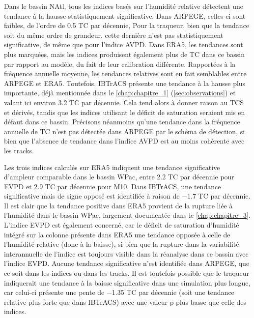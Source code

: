 \documentclass[../main.tex]{subfiles}
\begin{document}
Dans le bassin NAtl, tous les indices basés sur l'humidité relative détectent une tendance à la hausse statistiquement significative. Dans ARPEGE, celles-ci
sont faibles, de l'ordre de \num{0.5} TC par décennie, Pour la traqueur, bien que la tendance soit du même ordre de grandeur, cette dernière n'est pas
statistiquement significative, de même que pour l'indice AVPD. Dans ERA5, les tendances sont plus marquées, mais les indices produisent également plus de TC
dans ce bassin par rapport au modèle, du fait de leur calibration différente. Rapportées à la fréquence annuelle moyenne, les tendances relatives sont en fait
semblables entre ARPEGE et ERA5. Toutefois, IBTrACS présente une tendance à la hausse plus importante, déjà mentionnée dans le \cref{chap:chapitre_1}
(\cref{sec:observations}) et valant ici environ \num{3.2} TC par décennie. Cela tend alors à donner raison au TCS et dérivés, tandis que les indices utilisant
le déficit de saturation seraient mis en défaut dans ce bassin. Précisons néanmoins qu'une tendance dans la fréquence annuelle de TC n'est pas détectée dans
ARPEGE par le schéma de détection, si bien que l'absence de tendance dans l'indice AVPD est au moins cohérente avec les tracks.

Les trois indices calculés sur ERA5 indiquent une tendance significative d'ampleur comparable dans le bassin WPac, entre \num{2.2} TC par décennie pour EVPD et
\num{2.9} TC par décennie pour M10. Dans IBTrACS, une tendance significative mais de signe opposé est identifiée à raison de \num{-1.7} TC par décennie. Il est
clair que la tendance positive dans ERA5 provient de la rupture liée à l'humidité dans le bassin WPac, largement documentée dans le \cref{chap:chapitre_3}.
L'indice EVPD est également concerné, car le déficit de saturation d'humidité intégré sur la colonne présente dans ERA5 une tendance opposée à celle de
l'humidité relative (donc à la baisse), si bien que la rupture dans la variabilité interannuelle de l'indice est toujours visible dans la réanalyse dans ce
bassin avec l'indice EVPD. Aucune tendance significative n'est identifiée dans ARPEGE, que ce soit dans les indices ou dans les tracks. Il est toutefois
possible que le traqueur indiquerait une tendance à la baisse significative dans une simulation plus longue, car celui-ci présente une pente de \num{-1.35} TC
par décennie (soit une tendance relative plus forte que dans IBTrACS) avec une valeur-p plus basse que celle des indices.
\end{document}
